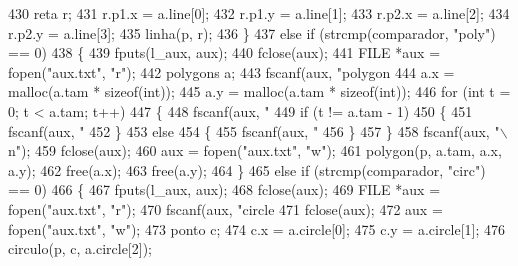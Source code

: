 \begin{DoxyCode}
{{430                 reta r;
431                 r.p1.x = a.line[0];
432                 r.p1.y = a.line[1];
433                 r.p2.x = a.line[2];
434                 r.p2.y = a.line[3];
435                 linha(p, r);
436             \}
437             \textcolor{keywordflow}{else} \textcolor{keywordflow}{if} (strcmp(comparador, \textcolor{stringliteral}{"poly"}) == 0)
438             \{
439                 fputs(l\_aux, aux);
440                 fclose(aux);
441                 FILE *aux = fopen(\textcolor{stringliteral}{"aux.txt"}, \textcolor{stringliteral}{"r"});
442                 polygons a;
443                 fscanf(aux, \textcolor{stringliteral}{"polygon %
444                 a.x = malloc(a.tam * \textcolor{keyword}{sizeof}(\textcolor{keywordtype}{int}));
445                 a.y = malloc(a.tam * \textcolor{keyword}{sizeof}(\textcolor{keywordtype}{int}));
446                 \textcolor{keywordflow}{for} (\textcolor{keywordtype}{int} t = 0; t < a.tam; t++)
447                 \{
448                     fscanf(aux, \textcolor{stringliteral}{"%
449                     \textcolor{keywordflow}{if} (t != a.tam - 1)
450                     \{
451                         fscanf(aux, \textcolor{stringliteral}{"%
452                     \}
453                     \textcolor{keywordflow}{else}
454                     \{
455                         fscanf(aux, \textcolor{stringliteral}{"%
456                     \}
457                 \}
458                 fscanf(aux, \textcolor{stringliteral}{"\(\backslash\)n"});
459                 fclose(aux);
460                 aux = fopen(\textcolor{stringliteral}{"aux.txt"}, \textcolor{stringliteral}{"w"});
461                 polygon(p, a.tam, a.x, a.y);
462                 free(a.x);
463                 free(a.y);
464             \}
465             \textcolor{keywordflow}{else} \textcolor{keywordflow}{if} (strcmp(comparador, \textcolor{stringliteral}{"circ"}) == 0)
466             \{
467                 fputs(l\_aux, aux);
468                 fclose(aux);
469                 FILE *aux = fopen(\textcolor{stringliteral}{"aux.txt"}, \textcolor{stringliteral}{"r"});
470                 fscanf(aux, \textcolor{stringliteral}{"circle %
471                 fclose(aux);
472                 aux = fopen(\textcolor{stringliteral}{"aux.txt"}, \textcolor{stringliteral}{"w"});
473                 ponto c;
474                 c.x = a.circle[0];
475                 c.y = a.circle[1];
476                 circulo(p, c, a.circle[2]);
}}}}}}}
\end{DoxyCode}
